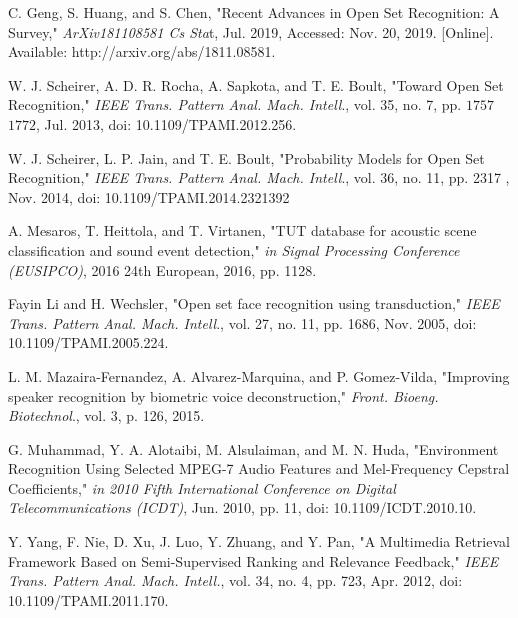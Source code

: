 \documentclass{ieeeaccess}
\begin{document}
 
\begin{thebibliography}{00}

 C. Geng, S. Huang, and S. Chen, "Recent Advances in Open Set Recognition: A Survey," \textit{ArXiv181108581 Cs Sta}t, Jul. 2019, Accessed: Nov. 20, 2019. [Online]. Available: http://arxiv.org/abs/1811.08581.

 W. J. Scheirer, A. D. R. Rocha, A. Sapkota, and T. E. Boult, "Toward Open Set Recognition," \textit{IEEE Trans. Pattern Anal. Mach. Intell}., vol. 35, no. 7, pp. $1757$ \textendash $1772$, Jul. 2013, doi: 10.1109/TPAMI.2012.256.

 W. J. Scheirer, L. P. Jain, and T. E. Boult, "Probability Models for Open Set Recognition," \textit{IEEE Trans. Pattern Anal. Mach. Intell}., vol. 36, no. 11, pp. 2317 , Nov. 2014, doi: 10.1109/TPAMI.2014.2321392

 A. Mesaros, T. Heittola, and T. Virtanen, "TUT database for acoustic scene classification and sound event detection," \textit{in Signal Processing Conference (EUSIPCO)}, 2016 24th European, 2016, pp. 1128. 

 Fayin Li and H. Wechsler, "Open set face recognition using transduction," \textit{IEEE Trans. Pattern Anal. Mach. Intell}., vol. 27, no. 11, pp. 1686, Nov. 2005, doi: 10.1109/TPAMI.2005.224.

 L. M. Mazaira-Fernandez, A. Alvarez-Marquina, and P. Gomez-Vilda, "Improving speaker recognition by biometric voice deconstruction," \textit{Front. Bioeng. Biotechnol}., vol. 3, p. 126, 2015.

 G. Muhammad, Y. A. Alotaibi, M. Alsulaiman, and M. N. Huda, "Environment Recognition Using Selected MPEG-7 Audio Features and Mel-Frequency Cepstral Coefficients,"\textit{ in 2010 Fifth International Conference on Digital Telecommunications (ICDT)}, Jun. 2010, pp. 11, doi: 10.1109/ICDT.2010.10.

 Y. Yang, F. Nie, D. Xu, J. Luo, Y. Zhuang, and Y. Pan, "A Multimedia Retrieval Framework Based on Semi-Supervised Ranking and Relevance Feedback," \textit{IEEE Trans. Pattern Anal. Mach. Intell.}, vol. 34, no. 4, pp. 723, Apr. 2012, doi: 10.1109/TPAMI.2011.170.


\end{thebibliography}
\end{document}
